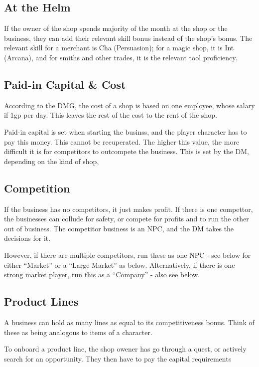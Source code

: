 \documentclass[twocolumn]{dndbook}
\begin{document}
\subsection{At the Helm}
If the owner of the shop spends majority of the month at the shop or the business,
they can add their relevant skill bonus instead of the shop's bonus.
The relevant skill for a merchant is Cha (Persuasion); for a magic shop,
it is Int (Arcana), and for smiths and other trades, it is the relevant tool proficiency.

\subsection{Paid-in Capital \& Cost}
According to the DMG, the cost of a shop is based on one employee, whose
salary if 1gp per day. This leaves the rest of the cost to the rent of the
shop.\par

Paid-in capital is set when starting the businss, and the player character
has to pay this money. This cannot be recuperated. The higher this value,
the more difficult it is for competitors to outcompete the business.
This is set by the DM, depending on the kind of shop,

\subsection{Competition}
If the business has no competitors, it just makes profit.
If there is one compettor, the businesses can collude for safety, or compete for profits
and to run the other out of business. The competitor business is an NPC,
and the DM takes the decisions for it.\par

However, if there are multiple competitors, run these as one NPC - see below
for either ``Market'' or a ``Large Market'' as below.
Alternatively, if there is one strong
market player, run this as a ``Company'' - also see below.

\subsection{Product Lines}

A business can hold as many lines as equal to its competitiveness bonus.
Think of these as being analogous to items of a character.\par

To onboard a product line, the shop owener has go through a quest, or
actively search for an opportunity. They then have to pay the
capital requirements
\end{document}
